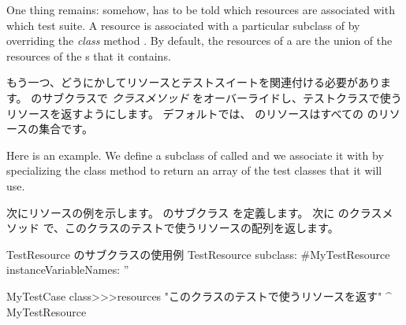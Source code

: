 \documentclass[a4paper,10pt,twoside]{book}
\begin{document}
One thing remains: somehow, \sunit has to be told which resources are associated with which test suite.
A resource is associated
with a particular subclass of  
by overriding the \emph{class} method .
By default, the resources of 
a  are
the union of the resources of
the s that it contains.
\fi

もう一つ、どうにかしてリソースとテストスイートを関連付ける必要があります。
 のサブクラスで  \emph{クラスメソッド} をオーバーライドし、テストクラスで使うリソースを返すようにします。
\ab{}
デフォルトでは、  のリソースはすべての  のリソースの集合です。

Here is an example. 
We define a subclass of  called
 and we associate it with 
by specializing the class method  to return an array
of the test classes that it will use.
\fi

次にリソースの例を示します。
 のサブクラス  を定義します。
次に  のクラスメソッド  で、このクラスのテストで使うリソースの配列を返します。

\begin{classdef}[mytestresource]{TestResource のサブクラスの使用例}
TestResource subclass: #MyTestResource
	instanceVariableNames: ''

MyTestCase class>>>resources
	"このクラスのテストで使うリソースを返す"
	^{ MyTestResource }
\end{classdef}




\end{document}
